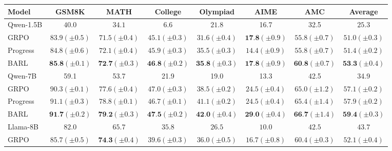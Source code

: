 \begin{table}[ht]
\small
\vspace{-0.1cm}
\centering
\begin{tabular}{l|ccccccc}
\hline
Model     & GSM8K & MATH & College & Olympiad & AIME & AMC & Average \\ \hline
Qwen-1.5B  & $40.0$ & $34.1$ & $6.6$ & $21.8$ & 16.7 & 32.5 & $25.3$  \\
\quad GRPO  & $83.9\scriptstyle(\pm0.5)$ & $71.5\scriptstyle(\pm0.4)$ & $45.1\scriptstyle(\pm0.3)$ & $31.6\scriptstyle(\pm0.4)$ & $\textbf{17.8}\scriptstyle(\pm0.9)$  & $55.8\scriptstyle(\pm0.7)$ & $51.0\scriptstyle(\pm0.3)$  \\
\quad Progress  & $84.8\scriptstyle(\pm0.6)$ & $72.1\scriptstyle(\pm0.4)$ & $45.9\scriptstyle(\pm0.3)$ & $35.5\scriptstyle(\pm0.3)$ & $14.4\scriptstyle(\pm0.9)$ & $55.8\scriptstyle(\pm0.7)$ & $51.4\scriptstyle(\pm0.2)$ \\
\quad BARL  & $\textbf{85.8}\scriptstyle(\pm0.1)$ & $\textbf{72.7}\scriptstyle(\pm0.3)$ & $\textbf{46.8}\scriptstyle(\pm0.2)$ & $\textbf{35.8}\scriptstyle(\pm0.3)$ &  $\textbf{17.8}\scriptstyle(\pm0.9)$  & $\textbf{60.8}\scriptstyle(\pm0.7)$ &$\textbf{53.3}\scriptstyle(\pm0.4)$ \\
\hline
Qwen-7B  & 59.1 & 53.7  & 21.9 & 19.0  & 13.3 & 42.5 & 34.9 \\
\quad GRPO  & $90.3\scriptstyle(\pm0.1)$ & $77.6\scriptstyle(\pm0.4)$ & $47.0\scriptstyle(\pm0.3)$ & $38.5\scriptstyle(\pm0.2)$ & $24.5\scriptstyle(\pm0.4)$ & $65.0\scriptstyle(\pm1.2)$ & $57.1\scriptstyle(\pm0.2)$ \\
\quad Progress  & $91.1\scriptstyle(\pm0.3)$ &  $78.8\scriptstyle(\pm0.1)$ & $46.7\scriptstyle(\pm0.1)$ & $41.1\scriptstyle(\pm0.2)$ & $24.5\scriptstyle(\pm0.4)$ &  $65.4\scriptstyle(\pm1.4)$ & $57.9\scriptstyle(\pm0.2)$  \\
\quad BARL & $\textbf{91.7}\scriptstyle(\pm0.2)$ & $\textbf{79.2}\scriptstyle(\pm0.3)$ & $\textbf{47.5}\scriptstyle(\pm0.2)$ & $\textbf{42.0}\scriptstyle(\pm0.4)$ & $\textbf{29.0}\scriptstyle(\pm0.4)$ & $\textbf{66.7}\scriptstyle(\pm1.4)$ &  $\textbf{59.4}\scriptstyle(\pm0.3)$  \\
\hline
Llama-8B  & $82.0$ & $65.7$ & $35.8$ & $26.5$  & $10.0$ & $42.5$ & $43.7$   \\
\quad GRPO  & $85.7\scriptstyle(\pm0.5)$ & $\textbf{74.3}\scriptstyle(\pm0.4)$ & $39.6\scriptstyle(\pm0.3)$ & $36.0\scriptstyle(\pm0.5)$ & $16.7\scriptstyle(\pm0.8)$ & $60.4\scriptstyle(\pm0.3)$ & $52.1\scriptstyle(\pm0.4)$ \\

\end{tabular}
\end{table}
